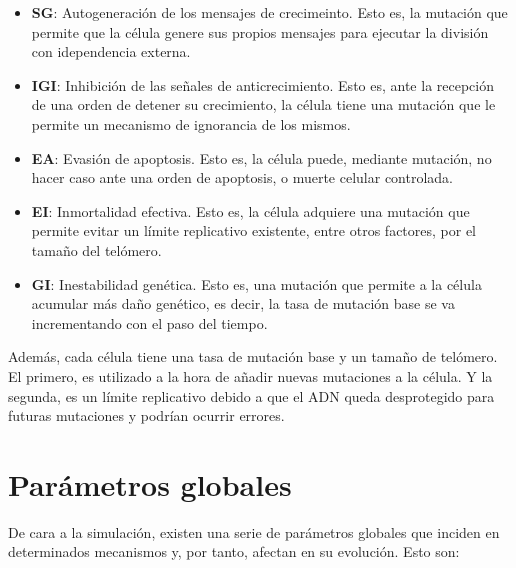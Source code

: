 \begin{itemize}
    \item \textbf{SG}: Autogeneración de los mensajes de crecimeinto. Esto es, la mutación que permite que la
    célula genere sus propios mensajes para ejecutar la división con idependencia externa.
    \item \textbf{IGI}: Inhibición de las señales de anticrecimiento. Esto es, ante la recepción de una orden
    de detener su crecimiento, la célula tiene una mutación que le permite un mecanismo de ignorancia de los mismos.
    \item \textbf{EA}: Evasión de apoptosis. Esto es, la célula puede, mediante mutación, no hacer caso ante
    una orden de apoptosis, o muerte celular controlada.
    \item \textbf{EI}: Inmortalidad efectiva. Esto es, la célula adquiere una mutación que permite evitar un límite
    replicativo existente, entre otros factores, por el tamaño del telómero.
    \item \textbf{GI}: Inestabilidad genética. Esto es, una mutación que permite a la célula acumular más daño genético, es decir,
    la tasa de mutación base se va incrementando con el paso del tiempo.
\end{itemize}

Además, cada célula tiene una tasa de mutación base y un tamaño de telómero. El primero, es utilizado a la hora
de añadir nuevas mutaciones a la célula. Y la segunda, es un límite replicativo debido a que el ADN queda
desprotegido para futuras mutaciones y podrían ocurrir errores.

\section{Parámetros globales}

De cara a la simulación, existen una serie de parámetros globales que inciden en determinados mecanismos y,
por tanto, afectan en su evolución. Esto son:

